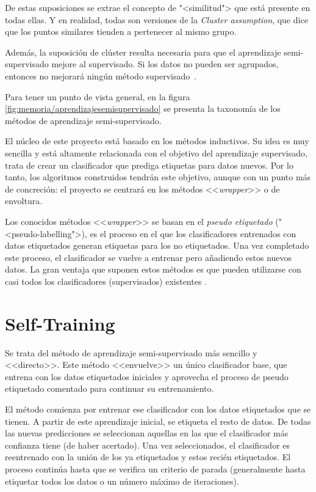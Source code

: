 De estas suposiciones se extrae el concepto de "<similitud"> que está presente
en todas ellas. Y en realidad, todas son versiones de la \textit{Cluster
assumption}, que dice que los puntos similares tienden a pertenecer al mismo
grupo. 

Además, la suposición de clúster resulta necesaria para que el aprendizaje
semi-supervisado mejore al supervisado. Si los datos no pueden ser agrupados,
entonces no mejorará ningún método supervisado~\cite{vanEngelen2020}.


Para tener un punto de vista general, en la figura \ref{fig:memoria/aprendizajesemisupervisado} se presenta la
taxonomía de los métodos de aprendizaje semi-supervisado.


El núcleo de este proyecto está basado en los métodos inductivos. Su idea es muy
sencilla y está altamente relacionada con el objetivo del aprendizaje
supervisado, trata de crear un clasificador que prediga etiquetas para datos
nuevos. Por lo tanto, los algoritmos construidos tendrán este objetivo, aunque
con un punto más de concreción: el proyecto se centrará en los métodos
<<\emph{wrapper}>> o de envoltura.

Los conocidos métodos <<\emph{wrapper}>> se basan en el \textit{pseudo
etiquetado} ("<pseudo-labelling">), es el proceso en el que los clasificadores
entrenados con datos etiquetados generan etiquetas para los no etiquetados. Una
vez completado este proceso, el clasificador se vuelve a entrenar pero añadiendo
estos nuevos datos. La gran ventaja que suponen estos métodos es que pueden
utilizarse con casi todos los clasificadores (supervisados) existentes
\cite{vanEngelen2020}.

\section{Self-Training}
Se trata del método de aprendizaje semi-supervisado más sencillo y <<directo>>.
Este método <<envuelve>> un único clasificador base, que entrena con los datos
etiquetados iniciales y aprovecha el proceso de pseudo etiquetado comentado para
continuar su entrenamiento.

El método comienza por entrenar ese clasificador con los datos etiquetados que
se tienen. A partir de este aprendizaje inicial, se etiqueta el resto de datos.
De todas las nuevas predicciones se seleccionan aquellas en las que el
clasificador más confianza tiene (de haber acertado). Una vez seleccionados, el
clasificador es reentrenado con la unión de los ya etiquetados y estos recién
etiquetados. El proceso continúa hasta que se verifica un criterio de parada
(generalmente hasta etiquetar todos los datos o un número máximo de
iteraciones).

